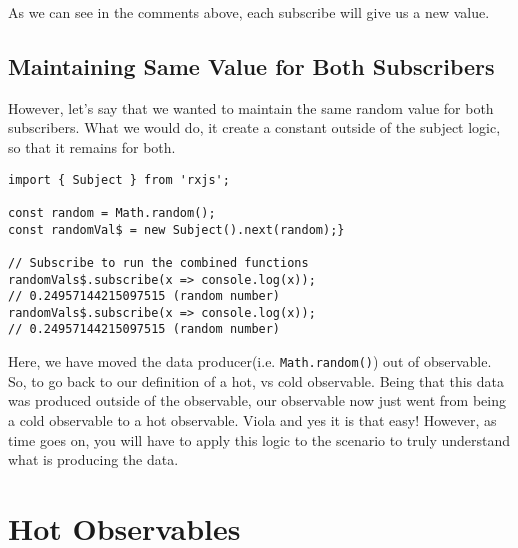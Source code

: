 As we can see in the comments above, each subscribe will give us a new value.

\subsection{Maintaining Same Value for Both Subscribers}
However, let's say that we wanted to maintain the same random value for 
both subscribers. What we would do, it create a constant outside of the 
subject logic, so that it remains for both. 

\begin{lstlisting}[caption=Turning Cold into Hot]
import { Subject } from 'rxjs';

const random = Math.random();
const randomVal$ = new Subject().next(random);}

// Subscribe to run the combined functions
randomVals$.subscribe(x => console.log(x));
// 0.24957144215097515 (random number)
randomVals$.subscribe(x => console.log(x));
// 0.24957144215097515 (random number)
\end{lstlisting}

Here, we have moved the data producer(i.e. \lstinline{Math.random()}) out of observable. So, to go back to our definition of a hot, vs cold observable. Being that this data was produced outside of the observable, our observable now just went from being a cold observable to a hot observable. Viola and yes it is that easy! However, as time goes on, you will have to apply this logic to the scenario to truly understand what is producing the data.

\section{Hot Observables}


